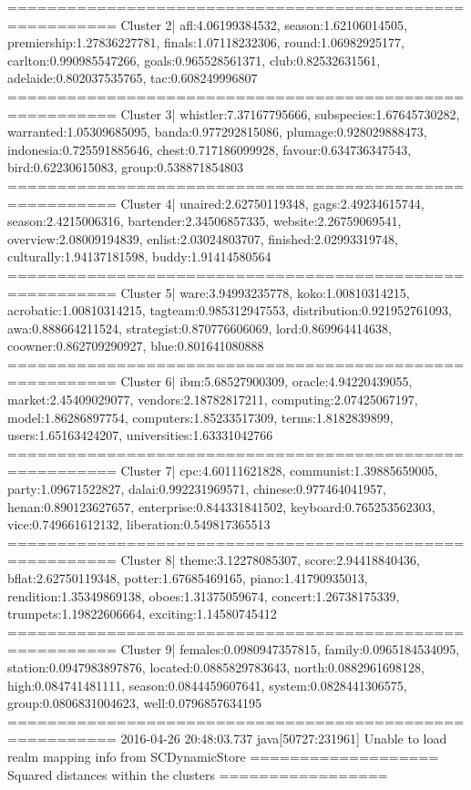 ========================================================= 
Cluster 2| afl:4.06199384532, season:1.62106014505, premiership:1.27836227781, finals:1.07118232306, round:1.06982925177, carlton:0.990985547266, goals:0.965528561371, club:0.82532631561, adelaide:0.802037535765, tac:0.608249996807
========================================================= 
Cluster 3| whistler:7.37167795666, subspecies:1.67645730282, warranted:1.05309685095, banda:0.977292815086, plumage:0.928029888473, indonesia:0.725591885646, chest:0.717186099928, favour:0.634736347543, bird:0.62230615083, group:0.538871854803
========================================================= 
Cluster 4| unaired:2.62750119348, gags:2.49234615744, season:2.4215006316, bartender:2.34506857335, website:2.26759069541, overview:2.08009194839, enlist:2.03024803707, finished:2.02993319748, culturally:1.94137181598, buddy:1.91414580564
========================================================= 
Cluster 5| ware:3.94993235778, koko:1.00810314215, acrobatic:1.00810314215, tagteam:0.985312947553, distribution:0.921952761093, awa:0.888664211524, strategist:0.870776606069, lord:0.869964414638, coowner:0.862709290927, blue:0.801641080888
========================================================= 
Cluster 6| ibm:5.68527900309, oracle:4.94220439055, market:2.45409029077, vendors:2.18782817211, computing:2.07425067197, model:1.86286897754, computers:1.85233517309, terms:1.8182839899, users:1.65163424207, universities:1.63331042766
========================================================= 
Cluster 7| cpc:4.60111621828, communist:1.39885659005, party:1.09671522827, dalai:0.992231969571, chinese:0.977464041957, henan:0.890123627657, enterprise:0.844331841502, keyboard:0.765253562303, vice:0.749661612132, liberation:0.549817365513
========================================================= 
Cluster 8| theme:3.12278085307, score:2.94418840436, bflat:2.62750119348, potter:1.67685469165, piano:1.41790935013, rendition:1.35349869138, oboes:1.31375059674, concert:1.26738175339, trumpets:1.19822606664, exciting:1.14580745412
========================================================= 
Cluster 9| females:0.0980947357815, family:0.0965184534095, station:0.0947983897876, located:0.0885829783643, north:0.0882961698128, high:0.084741481111, season:0.0844459607641, system:0.0828441306575, group:0.0806831004623, well:0.0796857634195
========================================================= 
2016-04-26 20:48:03.737 java[50727:231961] Unable to load realm mapping info from SCDynamicStore
=================== Squared distances within the clusters =================
